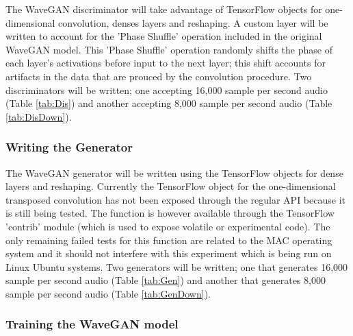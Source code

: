 \documentclass[a4paper, dvipsnames, titlepage]{article}
\begin{document}
The WaveGAN discriminator will take advantage of TensorFlow objects for one-dimensional convolution, denses layers and reshaping.
A custom layer will be written to account for the 'Phase Shuffle' operation included in the original WaveGAN model.
This 'Phase Shuffle' operation randomly shifts the phase of each layer's activations before input to the next layer; this shift accounts for artifacts in the data that are prouced by the convolution procedure.
Two discriminators will be written; one accepting 16,000 sample per second audio (Table \ref{tab:Dis}) and another accepting 8,000 sample per second audio (Table \ref{tab:DisDown}).

\subsubsection{Writing the Generator}

The WaveGAN generator will be written using the TensorFlow objects for dense layers and reshaping.
Currently the TensorFlow object for the one-dimensional transposed convolution has not been exposed through the regular API because it is still being tested.
The function is however available through the TensorFlow 'contrib' module (which is used to expose volatile or experimental code).
The only remaining failed tests for this function are related to the MAC operating system and it should not interfere with this experiment which is being run on Linux Ubuntu systems.
Two generators will be written; one that generates 16,000 sample per second audio (Table \ref{tab:Gen}) and another that generates 8,000 sample per second audio (Table \ref{tab:GenDown}).

\subsubsection{Training the WaveGAN model}
\end{document}
